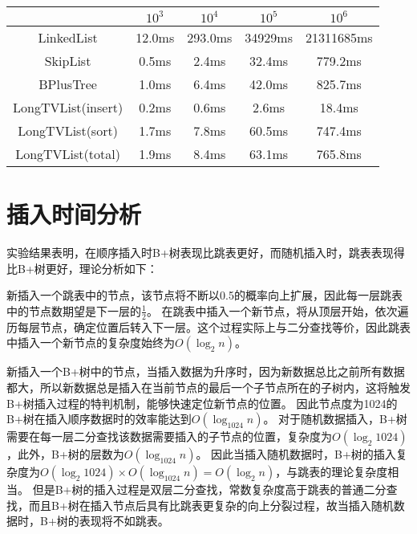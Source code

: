 \documentclass[UTF8]{article}
\begin{document}
\begin{tabular}{|c|c|c|c|c|}

    \hline
     & $10^3$ & $10^4$ & $10^5$ & $10^6$ \\
    \hline
    LinkedList & 12.0ms & 293.0ms & 34929ms & 21311685ms\\
    \hline
    SkipList & 0.5ms & 2.4ms & 32.4ms & 779.2ms\\
    \hline
    BPlusTree & 1.0ms & 6.4ms & 42.0ms & 825.7ms\\
    \hline
    LongTVList(insert) & 0.2ms & 0.6ms & 2.6ms & 18.4ms\\
    \hline
    LongTVList(sort) & 1.7ms & 7.8ms & 60.5ms & 747.4ms\\
    \hline
    LongTVList(total) & 1.9ms & 8.4ms & 63.1ms & 765.8ms\\
    \hline

\end{tabular}

\section{插入时间分析}
实验结果表明，在顺序插入时B+树表现比跳表更好，而随机插入时，跳表表现得比B+树更好，理论分析如下：

新插入一个跳表中的节点，该节点将不断以0.5的概率向上扩展，因此每一层跳表中的节点数期望是下一层的$\frac 12$。
在跳表中插入一个新节点，将从顶层开始，依次遍历每层节点，确定位置后转入下一层。这个过程实际上与二分查找等价，因此跳表中插入一个新节点的复杂度始终为$O(\log_2 n)$。

新插入一个B+树中的节点，当插入数据为升序时，因为新数据总比之前所有数据都大，所以新数据总是插入在当前节点的最后一个子节点所在的子树内，这将触发B+树插入过程的特判机制，能够快速定位新节点的位置。
因此节点度为1024的B+树在插入顺序数据时的效率能达到$O(\log_{1024} n)$。
对于随机数据插入，B+树需要在每一层二分查找该数据需要插入的子节点的位置，复杂度为$O(\log_{2} 1024)$，此外，B+树的层数为$O(\log_{1024} n)$。
因此当插入随机数据时，B+树的插入复杂度为$O(\log_{2} 1024) \times O(\log_{1024} n) = O(\log_{2} n)$，与跳表的理论复杂度相当。
但是B+树的插入过程是双层二分查找，常数复杂度高于跳表的普通二分查找，而且B+树在插入节点后具有比跳表更复杂的向上分裂过程，故当插入随机数据时，B+树的表现将不如跳表。
\end{document}
